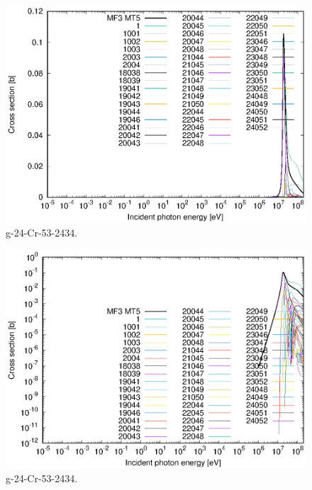 \begin{figure}
 \includegraphics[width=\linewidth]{eps/g_24-Cr-53_2434.eps}
  \caption{g-24-Cr-53-2434.}
\end{figure}
\begin{figure}
 \includegraphics[width=\linewidth]{eps-log/g_24-Cr-53_2434.eps}
 \caption{g-24-Cr-53-2434.}
\end{figure}
\newpage \clearpage

